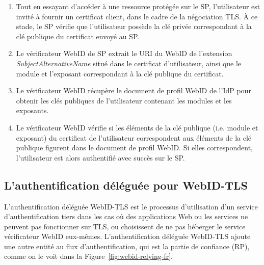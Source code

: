 \begin{enumerate}
\item Tout en essayant d'accéder à une ressource protégée sur le SP, l'utilisateur est invité à fournir un certificat client, dans le cadre de la négociation TLS. À ce stade, le SP vérifie que l'utilisateur possède la clé privée correspondant à la clé publique du certificat envoyé au SP.
\item Le vérificateur WebID de SP extrait le URI du WebID de l'extension \textit{SubjectAlternativeName} situé dans le certificat d'utilisateur, ainsi que le module et l'exposant correspondant à la clé publique du certificat.
\item Le vérificateur WebID récupère le document de profil WebID de l'IdP pour obtenir les clés publiques de l'utilisateur contenant les modules et les exposants.
\item Le vérificateur WebID vérifie si les éléments de la clé publique (i.e. module et exposant) du certificat de l'utilisateur correspondent aux éléments de la clé publique figurent dans le document de profil WebID. Si elles correspondent, l'utilisateur est alors authentifié avec succès sur le SP.
\end{enumerate}

\subsection*{L'authentification déléguée pour WebID-TLS}
L'authentification déléguée WebID-TLS est le processus d'utilisation d'un service d'authentification tiers dans les cas où des applications Web ou les services ne peuvent pas fonctionner sur TLS, ou choisissent de ne pas héberger le service vérificateur WebID eux-mêmes. L'authentification déléguée WebID-TLS ajoute une autre entité au flux d'authentification, qui est la partie de confiance (RP), comme on le voit dans la Figure~\ref{fig:webid-relying-fr}.\\


